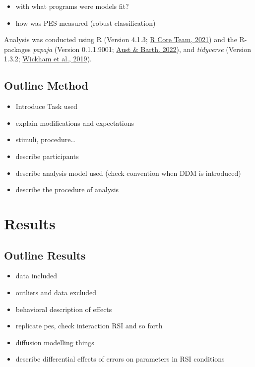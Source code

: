 \documentclass[
  man,floatsintext]{apa7}
\providecommand{\tightlist}{%
  \setlength{\itemsep}{0pt}\setlength{\parskip}{0pt}}
\begin{document}
\begin{itemize}
\tightlist
\item
  with what programs were models fit?
\item
  how was PES measured (robust classification)
\end{itemize}

Analysis was conducted using R (Version 4.1.3; \protect\hyperlink{ref-R-base}{R Core Team, 2021}) and the R-packages \emph{papaja} (Version 0.1.1.9001; \protect\hyperlink{ref-R-papaja}{Aust \& Barth, 2022}), and \emph{tidyverse} (Version 1.3.2; \protect\hyperlink{ref-R-tidyverse}{Wickham et al., 2019}).

\hypertarget{outline-method}{%
\subsection{Outline Method}\label{outline-method}}

\begin{itemize}
\tightlist
\item
  Introduce Task used
\item
  explain modifications and expectations
\item
  stimuli, procedure\ldots{}
\item
  describe participants
\item
  describe analysis model used (check convention when DDM is introduced)
\item
  describe the procedure of analysis
\end{itemize}

\hypertarget{results}{%
\section{Results}\label{results}}

\hypertarget{outline-results}{%
\subsection{Outline Results}\label{outline-results}}

\begin{itemize}
\tightlist
\item
  data included
\item
  outliers and data excluded
\item
  behavioral description of effects
\item
  replicate pes, check interaction RSI and so forth
\item
  diffusion modelling things
\item
  describe differential effects of errors on parameters in RSI conditions
\end{itemize}
\end{document}
